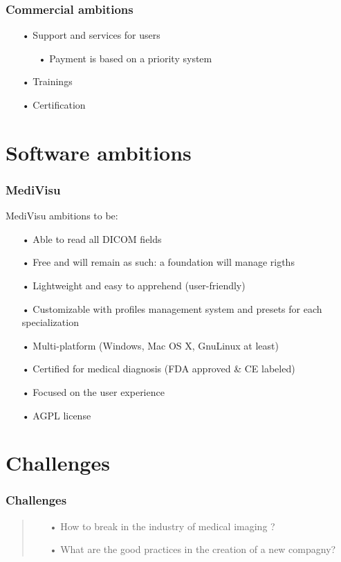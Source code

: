 \documentclass[11pt]{beamer}
\begin{document}
\begin{frame}
\frametitle{Commercial ambitions}
\begin{itemize}[<+->]
\item[•] Support and services for users
\begin{itemize}[<+->]
\item[•] Payment is based on a priority system
\end{itemize}
\item[•] Trainings
\item[•] Certification
\end{itemize}
\end{frame}

\section{Software ambitions}

\begin{frame}
\frametitle{MediVisu}
MediVisu ambitions to be:
\begin{itemize}[<+->]
\item[•] Able to read all DICOM fields
\item[•] Free and will remain as such: a foundation will manage rigths
\item[•] Lightweight and easy to apprehend (user-friendly)
\item[•] Customizable with profiles management system and presets for each specialization
\item[•] Multi-platform (Windows, Mac OS X, GnuLinux at least)
\item[•] Certified for medical diagnosis (FDA approved \& CE labeled)
\item[•] Focused on the user experience
\item[•] AGPL license
\end{itemize}
\end{frame}

\section{Challenges}

\begin{frame}
\frametitle{Challenges}
\begin{quote}
\begin{itemize}[<+->]
\item[•] How to break in the industry of medical imaging ?
\item[•] What are the good practices in the creation of a new compagny?
\end{itemize}
\end{quote}
\end{frame}
\end{document}
